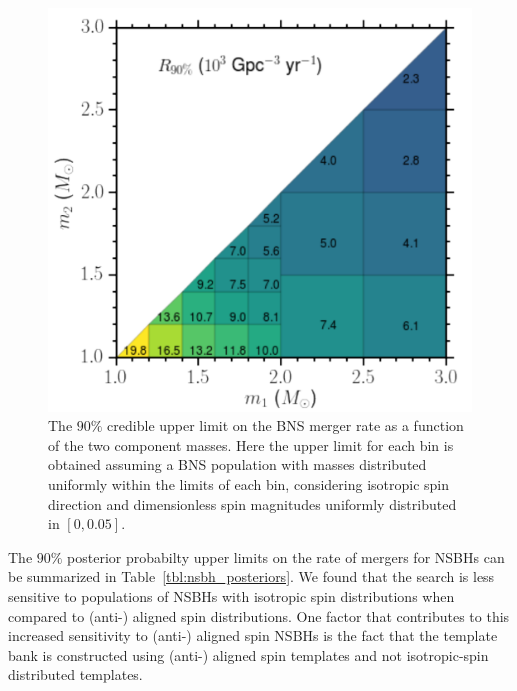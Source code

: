 \begin{figure}
    \centering
    \includegraphics{figs/chapter4/bns_uniform_mass_isotropic_low_spin_rates.png}
    \caption{The $90 \%$ credible upper limit on the BNS merger rate as a function of the two component masses. Here the upper limit for each bin is obtained assuming a BNS population with masses distributed uniformly within the limits of each bin, considering isotropic spin direction and dimensionless spin magnitudes uniformly distributed in $[0,0.05]$.}
    \label{fig:bns_uniform_upper_limits}
\end{figure}

The $90 \%$ posterior probabilty upper limits on the rate of mergers for NSBHs can be summarized in Table~\ref{tbl:nsbh_posteriors}. We found that the search is less sensitive to populations of NSBHs with isotropic spin distributions when compared to (anti-) aligned spin distributions. One factor that contributes to this increased sensitivity to (anti-) aligned spin NSBHs is the fact that the template bank is constructed using (anti-) aligned spin templates and not isotropic-spin distributed templates.

